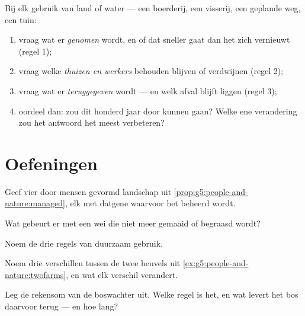\begin{method}\label{met:g5:people-and-nature:judge}
Bij elk gebruik van land of water --- een boerderij, een visserij, een
geplande weg, een tuin:
\begin{enumerate}
  \item vraag wat er \emph{genomen} wordt, en of dat sneller gaat dan
        het zich vernieuwt (regel 1);
  \item vraag welke \emph{thuizen en werkers} behouden blijven of
        verdwijnen (regel 2);
  \item vraag wat er \emph{teruggegeven} wordt --- en welk afval blijft
        liggen (regel 3);
  \item oordeel dan: zou dit honderd jaar door kunnen gaan? Welke ene
        verandering zou het antwoord het meest verbeteren?
\end{enumerate}
\end{method}

\section{Oefeningen}

\begin{exercise}[$\star$]\label{exo:g5:people-and-nature:1}
Geef vier  door mensen gevormd landschap uit
\cref{prop:g5:people-and-nature:managed}, elk met datgene waarvoor het
beheerd wordt.
\end{exercise}

\begin{exercise}[$\star$]\label{exo:g5:people-and-nature:2}
Wat gebeurt er met een wei die niet meer gemaaid of begraasd wordt?
\end{exercise}

\begin{exercise}[$\star$]\label{exo:g5:people-and-nature:3}
Noem de drie regels van duurzaam gebruik.
\end{exercise}

\begin{exercise}[$\star$]\label{exo:g5:people-and-nature:4}
Noem drie verschillen tussen de twee heuvels uit
\cref{ex:g5:people-and-nature:twofarms}, en wat elk verschil verandert.
\end{exercise}

\begin{exercise}[$\star$]\label{exo:g5:people-and-nature:5}
Leg de rekensom van de boswachter uit. Welke regel is het, en wat levert
het bos daarvoor terug --- en hoe lang?
\end{exercise}

